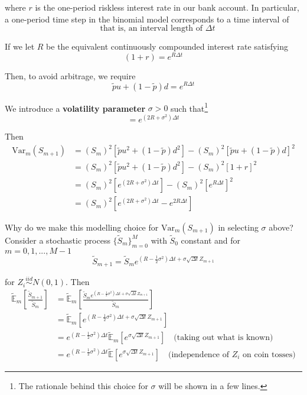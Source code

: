 \documentclass[12pt]{article}
\newlength\tindent
\renewcommand{\indent}{\hspace*{\tindent}}
\newcommand{\E}{\mathbb E}
\newcommand{\Var}{\mathrm{Var}}
\begin{document}
where $r$ is the one-period riskless interest rate in our bank account. In particular, a one-period time step in the binomial model corresponds to a time interval of
\begin{equation*}
	[t_m,t_{m + 1}] \quad \text{that is, an interval length of $\Delta t$}
\end{equation*}

If we let $R$ be the equivalent continuously compounded interest rate satisfying
\begin{equation*}
	(1 + r) = e^{R\Delta t}
\end{equation*}

Then, to avoid arbitrage, we require
\begin{equation*}
	\tilde{p}u + (1 - \tilde{p})d = e^{R\Delta t}
\end{equation*}

We introduce a {\bf volatility parameter} $\sigma > 0$ such that\footnote{The rationale behind this choice for $\sigma$ will be shown in a few lines.}
\begin{equation*}
	[u^2\tilde{p} + (1 - \tilde{p}d^2] = e^{(2R + \sigma^2)\Delta t}
\end{equation*}

Then
\begin{align*}
	\Var_m(S_{m + 1}) &= (S_m)^2[\tilde{p}u^2 + (1 - \tilde{p})d^2] - (S_m)^2[\tilde{p}u + (1 - \tilde{p})d]^2 \\
	&= (S_m)^2[\tilde{p}u^2 + (1 - \tilde{p})d^2] - (S_m)^2[1 + r]^2 \\
	&= (S_m)^2\left[e^{(2R + \sigma^2)\Delta t}\right] - (S_m)^2\left[e^{R\Delta t}\right]^2 \\
	&= (S_m)^2\left[e^{(2R + \sigma^2)\Delta t} - e^{2R\Delta t}\right]
\end{align*}

\indent Why do we make this modelling choice for $\Var_m(S_{m + 1})$ in selecting $\sigma$ above? Consider a stochastic process $\{\tilde{S}_m\}^M_{m = 0}$ with $\tilde{S}_0$ constant and for $m = 0,1,...,M - 1$
\begin{equation*}
	\tilde{S}_{m + 1} = \tilde{S}_m e^{(R - \frac{1}{2}\sigma^2)\Delta t + \sigma\sqrt{\Delta t}Z_{m + 1}}
\end{equation*}

for $Z_i \stackrel{iid}{\sim} N(0,1)$. Then
\begin{align*}
	\tilde{\E}_m \left[ \frac{\tilde{S}_{m + 1}}{\tilde{S}_m} \right] &= 	\tilde{\E}_m \left[ \frac{\tilde{S}_m e^{(R - \frac{1}{2}\sigma^2)\Delta t + \sigma\sqrt{\Delta t}Z_{m + 1}}}{ \tilde{S}_m }\right] \\
	&= \tilde{\E}_m \left[ e^{(R - \frac{1}{2}\sigma^2)\Delta t + \sigma\sqrt{\Delta t}Z_{m + 1}} \right] \\
	&=  e^{(R - \frac{1}{2}\sigma^2)\Delta t} \tilde{\E}_m \left[ e^{\sigma\sqrt{\Delta t}Z_{m + 1}} \right] \quad \text{(taking out what is known)} \\
	&=  e^{(R - \frac{1}{2}\sigma^2)\Delta t} \tilde{\E} \left[ e^{\sigma\sqrt{\Delta t}Z_{m + 1}} \right] \quad \text{(independence of $Z_i$ on coin tosses)} 
\end{align*}
\end{document}
